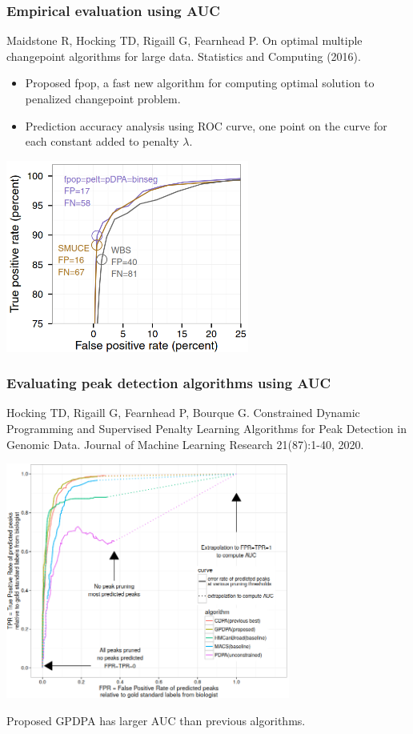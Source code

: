 \documentclass[t]{beamer}
\DeclareMathOperator*{\argmin}{arg\,min}
\begin{document}
\begin{frame}
  \frametitle{Empirical evaluation using AUC}

  {\scriptsize Maidstone R, Hocking TD, Rigaill G, Fearnhead P. On optimal multiple
  changepoint algorithms for large data. Statistics and Computing
  (2016).}

  \begin{itemize}
  \item Proposed fpop, a fast new algorithm for computing optimal solution to
    penalized changepoint problem.
\item Prediction accuracy analysis using ROC curve, one point on the curve for each constant added to penalty $\lambda$.
  \end{itemize}

  \includegraphics[width=0.6\textwidth]{figure-Maidstone-roc}
\end{frame}

\begin{frame}
  \frametitle{Evaluating peak detection algorithms using AUC}
{\scriptsize Hocking TD, Rigaill G, Fearnhead P, Bourque G. Constrained Dynamic Programming and Supervised Penalty Learning Algorithms for Peak Detection in Genomic Data. Journal of Machine Learning Research 21(87):1-40, 2020.}

  \includegraphics[width=0.7\textwidth]{figure-Hocking2020-roc}

  Proposed GPDPA has larger AUC than previous algorithms.

\end{frame}
\end{document}

